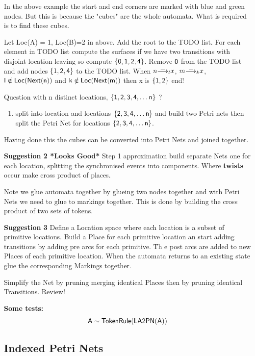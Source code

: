 \documentclass[]{article}
\begin{document}
{In the above example the start and end corners are marked with blue and green nodes. But this is because the "cubes" are the whole automata. What is required is to find these cubes. 

 Let {\sf Loc(A) = 1, Loc(B)=2} in above.   Add the root {} to the TODO list. For each element in TODO list compute the surfaces if  we have  two transitions with disjoint location leaving  so compute $\sf \{0,1,2,4\}$. Remove $\sf 0$ from the TODO list and add nodes ${\sf \{1,2,4\}}$ to the TODO list.  When 
$\arop{n}{\_}{x}{l}$,  $\arop{m}{\_}{x}{k}$, ${\sf  l \notin Loc(Next(n))}$ and ${\sf  k \notin Loc(Next(m))}$ then {\sf x} is ${\sf \{1,2\}}$ end!

Question with {\sf n} distinct locations, $\sf \{1,2,3,4,\ldots n\}$ ?
\begin{enumerate}
\item split into location {} and locations $\sf \{2,3,4,\ldots n\}$ and build two Petri nets then split the Petri Net for locations $\sf \{2,3,4,\ldots n\}$.
\end{enumerate}
Having done this the cubes can be converted into Petri Nets and joined together.

{\bf Suggestion 2 *Looks Good*} Step 1 approximation build separate Nets one for each location, splitting the  synchronised events into components. Where {\bf twists} occur make cross product of places.

Note we glue automata together by glueing two nodes together and with Petri Nets we need to glue to markings together. This is done by building the cross product of  two sets of tokens.

{\bf Suggestion 3}   Define a Location space where each location is a subset of primitive locations. Build a Place for each primitive location an start adding transitions by adding pre arcs for each primitive. Th e post arcs are added to new Places of each primitive  location. When the automata returns to an existing state  glue the corresponding Markings together.   

Simplify the Net  by pruning merging identical Places then by pruning identical Transitions.  Review!

{\bf Some  tests:}
\[{\sf A\sim  TokenRule(LA2PN(A))}\]

\subsection{Indexed Petri Nets}

}
\end{document}
